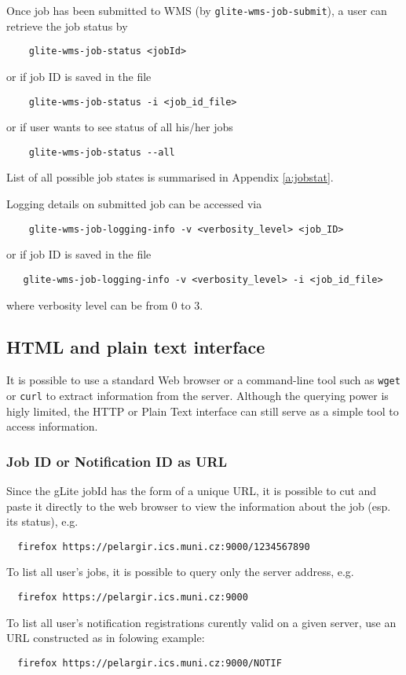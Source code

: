 Once job has been submitted to WMS (by \verb'glite-wms-job-submit'), 
a user can retrieve the job status by
\begin{verbatim}
    glite-wms-job-status <jobId>
\end{verbatim}
or if job ID is saved in the file
\begin{verbatim}
    glite-wms-job-status -i <job_id_file>
\end{verbatim}
or if user wants to see status of all his/her jobs
\begin{verbatim}
    glite-wms-job-status --all
\end{verbatim}
List of all possible job states is summarised in Appendix \ref{a:jobstat}.

Logging details on submitted job can be accessed via
\begin{verbatim}
    glite-wms-job-logging-info -v <verbosity_level> <job_ID>
\end{verbatim}
or if job ID is saved in the file
\begin{verbatim}
   glite-wms-job-logging-info -v <verbosity_level> -i <job_id_file>
\end{verbatim}
where verbosity level can be from 0 to 3. 







\subsection{HTML and plain text interface}

It is possible to use a standard Web browser or a command-line tool such as \texttt{wget} or \texttt{curl} to extract information from the \LB server. Although the querying power is higly limited, the HTTP or Plain Text interface can still serve as a simple tool to access information.

\subsubsection{Job ID or Notification ID as URL}
\label{simple}
Since the gLite jobId has the form of a unique URL, it is possible to cut and paste it directly
to the web browser to view the information about the job (esp. its status), e.g.
\begin{verbatim}
  firefox https://pelargir.ics.muni.cz:9000/1234567890
\end{verbatim}
To list all user's jobs, it is possible to query only the \LB server address, e.g.
\begin{verbatim}
  firefox https://pelargir.ics.muni.cz:9000
\end{verbatim}
To list all user's notification registrations curently valid on a given \LB server, use an URL constructed as in folowing example:
\begin{verbatim}
  firefox https://pelargir.ics.muni.cz:9000/NOTIF
\end{verbatim}

